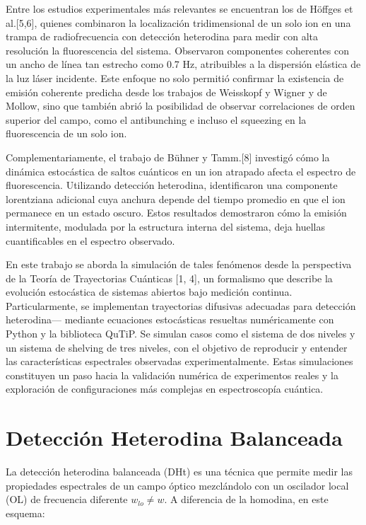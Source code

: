 \documentclass[12pt]{report}
\begin{document}
Entre los estudios experimentales más relevantes se encuentran los de Höffges et al.[5,6], quienes combinaron la localización tridimensional de un solo ion en una trampa de radiofrecuencia con detección heterodina para medir con alta resolución la fluorescencia del sistema. Observaron componentes coherentes con un ancho de línea tan estrecho como 0.7 Hz, atribuibles a la dispersión elástica de la luz láser incidente. Este enfoque no solo permitió confirmar la existencia de emisión coherente predicha desde los trabajos de Weisskopf y Wigner y de Mollow, sino que también abrió la posibilidad de observar correlaciones de orden superior del campo, como el antibunching e incluso el squeezing en la fluorescencia de un solo ion.

Complementariamente, el trabajo de Bühner y Tamm.[8] investigó cómo la dinámica estocástica de saltos cuánticos en un ion atrapado afecta el espectro de fluorescencia. Utilizando detección heterodina, identificaron una componente lorentziana adicional cuya anchura depende del tiempo promedio en que el ion permanece en un estado oscuro. Estos resultados demostraron cómo la emisión intermitente, modulada por la estructura interna del sistema, deja huellas cuantificables en el espectro observado.

En este trabajo se aborda la simulación de tales fenómenos desde la perspectiva de la Teoría de Trayectorias Cuánticas [1, 4], un formalismo que describe la evolución estocástica de sistemas abiertos bajo medición continua. Particularmente, se implementan trayectorias difusivas adecuadas para detección heterodina— mediante ecuaciones estocásticas resueltas numéricamente con Python y la biblioteca QuTiP. Se simulan casos como el sistema de dos niveles y un sistema de shelving de tres niveles, con el objetivo de reproducir y entender las características espectrales observadas experimentalmente. Estas simulaciones constituyen un paso hacia la validación numérica de experimentos reales y la exploración de configuraciones más complejas en espectroscopía cuántica.


\section*{Detección Heterodina Balanceada}

La detección heterodina balanceada (DHt) es una técnica que permite medir las propiedades espectrales de un campo óptico mezclándolo con un oscilador local (OL) de frecuencia diferente $w_{lo} \neq w$. A diferencia de la homodina, en este esquema:
\end{document}
